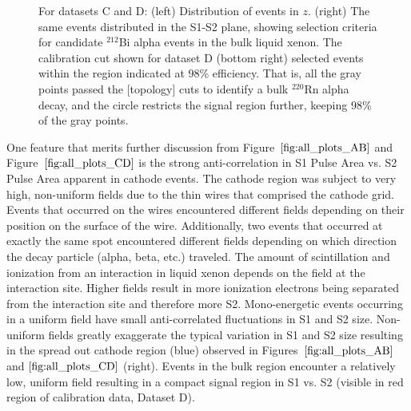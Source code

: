 \begin{figure}
\caption{For datasets C and D: (left) Distribution of events in $z$. (right) The same events distributed in the S1-S2 plane, showing selection criteria for candidate $^{212}$Bi alpha events in the bulk liquid xenon. The calibration cut shown for dataset D (bottom right) selected events within the region indicated at 98\% efficiency. That is, all the gray points passed the [topology] cuts to identify a bulk  $^{220}$Rn alpha decay, and the circle restricts the signal region further, keeping 98\% of the gray points. } 
\label{fig:all_plots_CD}
\end{figure}

One feature that merits further discussion from Figure~$\ref{fig:all_plots_AB}$ and Figure~$\ref{fig:all_plots_CD}$ is the strong anti-correlation in S1 Pulse Area vs. S2 Pulse Area apparent in cathode events. The cathode region was subject to very high, non-uniform fields due to the thin wires that comprised the cathode grid. Events that occurred on the wires encountered different fields depending on their position on the surface of the wire. Additionally, two events that occurred at exactly the same spot encountered different fields depending on which direction the decay particle (alpha, beta, etc.) traveled. The amount of scintillation and ionization from an interaction in liquid xenon depends on the field at the interaction site. Higher fields result in more ionization electrons being separated from the interaction site and therefore more S2. Mono-energetic events occurring in a uniform field have small anti-correlated fluctuations in S1 and S2 size. Non-uniform fields greatly exaggerate the typical variation in S1 and S2 size resulting in the spread out cathode region (blue) observed in Figures~$\ref{fig:all_plots_AB}$ and $\ref{fig:all_plots_CD}$  (right). Events in the bulk region encounter a relatively low, uniform field resulting in a compact signal region in S1 vs. S2 (visible in red region of calibration data, Dataset D). 

